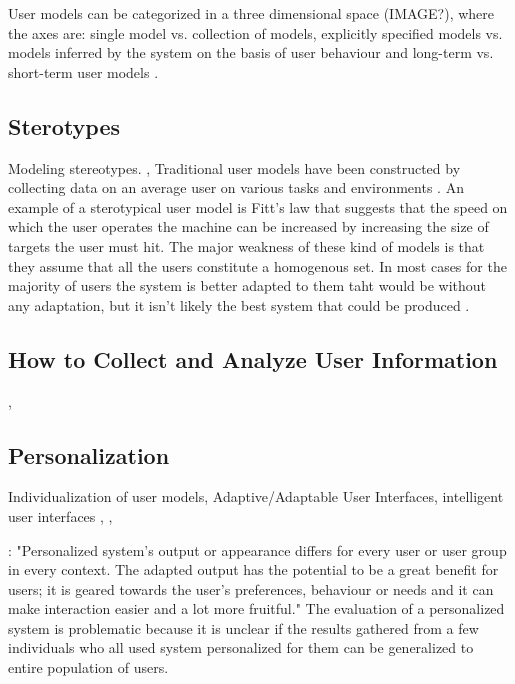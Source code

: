 \documentclass{sigchi}
\begin{document}
User models can be categorized in a three dimensional space (IMAGE?), where the axes are:  single model vs. collection of models, explicitly specified models vs. models inferred by the system on the basis of user behaviour and long-term vs. short-term user models .

\subsection{Sterotypes}
Modeling stereotypes. 
\cite{dillon96}, \cite{pu02}
Traditional user models have been constructed by collecting data on an average user on various tasks and environments \cite{rich99}. An example of a sterotypical user model is Fitt's law that suggests that the speed on which the user operates the machine can be increased by increasing the size of targets the user must hit. The major weakness of these kind of models is that they assume that all the users constitute a homogenous set. In most cases for the majority of users the system is better adapted to them taht would be without any adaptation, but it isn't likely the best system that could be produced \cite{rich99}.

\subsection{How to Collect and Analyze User Information}
\cite{pazzani97}, \cite{white10}

\subsection{Personalization}
Individualization of user models, Adaptive/Adaptable User Interfaces, intelligent user interfaces
\cite{bunt04}, \cite{findlater04}, \cite{brusi96}

\cite{van08}: "Personalized system's output or appearance differs for every user or user group in every context. The adapted output has the potential to be a great benefit for users; it is geared towards the user's preferences, behaviour or needs and it can make interaction easier and a lot more fruitful." The evaluation of a personalized system is problematic because it is unclear if the results gathered from a few individuals who all used system personalized for them can be generalized to entire population of users.
\end{document}
